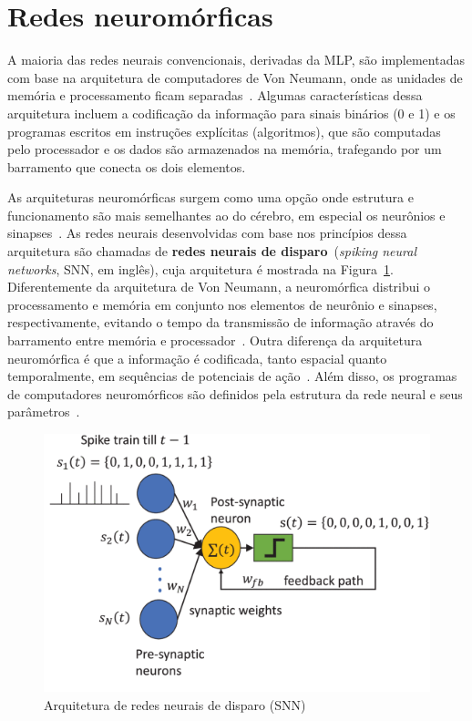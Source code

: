 \section{Redes neuromórficas}\label{sec:redesneuromorficas}
A maioria das redes neurais convencionais, derivadas da MLP, são implementadas com base na arquitetura de computadores de Von Neumann, onde as unidades de memória e processamento ficam separadas~\cite{von_neumann_first_1993}. Algumas características dessa arquitetura incluem a codificação da informação para sinais binários (0 e 1) e os programas escritos em instruções explícitas (algoritmos), que são computadas pelo processador e os dados são armazenados na memória, trafegando por um barramento que conecta os dois elementos.

As arquiteturas neuromórficas surgem como uma opção onde estrutura e funcionamento são mais semelhantes ao do cérebro, em especial os neurônios e sinapses~\cite{ivanov_neuromorphic_2022}. As redes neurais desenvolvidas com base nos princípios dessa arquitetura são chamadas de \textbf{redes neurais de disparo}~(\textit{spiking neural networks}, SNN, em inglês), cuja arquitetura é mostrada na Figura~\ref{fig:snn}. Diferentemente da arquitetura de Von Neumann, a neuromórfica distribui o processamento e memória em conjunto nos elementos de neurônio e sinapses, respectivamente, evitando o tempo da transmissão de informação através do barramento entre memória e processador~\cite{indiveri_memory_2015}. Outra diferença da arquitetura neuromórfica é que a informação é codificada, tanto espacial quanto temporalmente, em sequências de potenciais de ação~\cite{frenkel_bottom-up_2023}. Além disso, os programas de computadores neuromórficos são definidos pela estrutura da rede neural e seus parâmetros~\cite{schuman_opportunities_2022}.
\begin{figure}[tb]
	\centering
	\caption[Arquitetura de redes neurais de disparo (SNN)]{Arquitetura de redes neurais de disparo (SNN)}
	\label{fig:snn}
	\includegraphics[width=0.7\linewidth]{figs/snn}
\end{figure}


